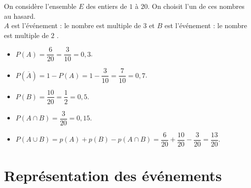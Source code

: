 \begin{ex}{}{}
On considère l'ensemble $E$ des entiers de $1$ à $20$. On choisit l'un de ces nombres au hasard. \\
$A$ est l'événement : \og le nombre est multiple de $3$ \fg{} et $B$ est l'événement : \og le nombre est multiple de $2$ \fg.
   
\begin{minipage}{7cm}
\begin{itemize}
\item[] $P(A)=\dfrac{6}{20}=\dfrac{3}{10}=0,3$.
\item[] $P(\overline{A})=1-P(A)=1-\dfrac{3}{10}=\dfrac{7}{10}=0,7$.
\item[] $P(B)=\dfrac{10}{20}=\dfrac{1}{2}=0,5$.
\end{itemize}
\end{minipage}
\begin{minipage}{9cm}
\begin{itemize} 
\item[] $P(A \cap B)=\dfrac{3}{20}=0,15$.
\item[] $P(A \cup B)=p(A)+p(B)-p(A\cap B)=\dfrac{6}{20}+\dfrac{10}{20}-\dfrac{3}{20}=\dfrac{13}{20}$.
\end{itemize}
\end{minipage}
\end{ex}

\section{Représentation des événements} 

